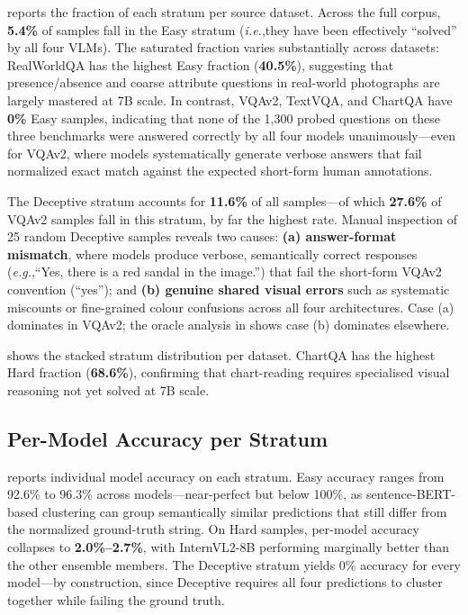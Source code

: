 \documentclass[10pt,twocolumn,letterpaper]{article}
\newcommand{\ie}{\emph{i.e.},}
\newcommand{\eg}{\emph{e.g.},}
\begin{document}
 reports the fraction of each stratum per source dataset.
Across the full corpus, \textbf{5.4\%} of samples fall in the Easy stratum
(\ie they have been effectively ``solved'' by all four VLMs).
The saturated fraction varies substantially across datasets: RealWorldQA has
the highest Easy fraction (\textbf{40.5\%}), suggesting that presence/absence
and coarse attribute questions in real-world photographs are largely mastered
at 7B scale.  In contrast, VQAv2, TextVQA, and ChartQA have \textbf{0\%} Easy
samples, indicating that none of the 1,300 probed questions on these three benchmarks
were answered correctly by all four models unanimously---even for VQAv2, where
models systematically generate verbose answers that fail normalized exact match
against the expected short-form human annotations.

The Deceptive stratum accounts for \textbf{11.6\%} of all samples---of which
\textbf{27.6\%} of VQAv2 samples fall in this stratum, by far the highest rate.
Manual inspection of 25 random Deceptive samples reveals two causes:
\textbf{(a) answer-format mismatch}, where models produce verbose, semantically
correct responses (\eg ``Yes, there is a red sandal in the image.'') that
fail the short-form VQAv2 convention (``yes''); and \textbf{(b) genuine shared
visual errors} such as systematic miscounts or fine-grained colour confusions
across all four architectures.  Case (a) dominates in VQAv2; the oracle
analysis in  shows case (b) dominates elsewhere.

 shows the stacked stratum distribution per dataset.
ChartQA has the highest Hard fraction (\textbf{68.6\%}), confirming that
chart-reading requires specialised visual reasoning not yet solved at 7B
scale.

\subsection{Per-Model Accuracy per Stratum}
\label{sec:accuracy}

\begin{table}[t]
\centering
\caption{Accuracy (\%) per model on each stratum.}
\label{tab:accuracy}
\small

\end{table}

 reports individual model accuracy on each stratum.
Easy accuracy ranges from 92.6\% to 96.3\% across models---near-perfect but
below 100\%, as sentence-BERT-based clustering can group semantically similar
predictions that still differ from the normalized ground-truth string.  On
Hard samples, per-model accuracy collapses to \textbf{2.0\%--2.7\%}, with
InternVL2-8B performing marginally better than the other ensemble members.
The Deceptive stratum yields 0\% accuracy for every model---by
construction, since Deceptive requires all four predictions to cluster together
while failing the ground truth.
\end{document}
